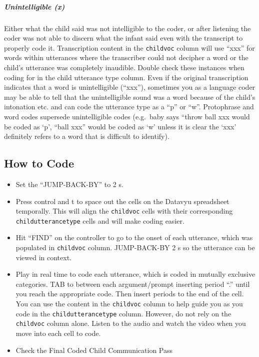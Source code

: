 \documentclass[
  12pt,
]{book}
\providecommand{\tightlist}{%
  \setlength{\itemsep}{0pt}\setlength{\parskip}{0pt}}
\begin{document}
\hypertarget{unintelligible_child}{%
\subparagraph*{Unintelligible (x)}\label{unintelligible_child}}

Either what the child said was not intelligible to the coder, or after listening the coder was not able to discern what the infant said even with the transcript to properly code it. Transcription content in the \texttt{childvoc} column will use ``xxx'' for words within utterances where the transcriber could not decipher a word or the child's utterance was completely inaudible. Double check these instances when coding for in the child utterance type column. Even if the original transcription indicates that a word is unintelligible (``xxx''), sometimes you as a language coder may be able to tell that the unintelligible sound was a word because of the child's intonation etc. and can code the utterance type as a ``p'' or ``w''.
Protophrase and word codes supersede unintelligible codes (e.g.~baby says ``throw ball xxx would be coded as `p', ``ball xxx'' would be coded as `w' unless it is clear the `xxx' definitely refers to a word that is difficult to identify).

\hypertarget{how-to-code}{%
\subsection*{How to Code}\label{how-to-code}}

\begin{itemize}
\tightlist
\item
  Set the ``JUMP-BACK-BY'' to 2 s.
\item
  Press control and t to space out the cells on the Datavyu spreadsheet temporally. This will align the \texttt{childvoc} cells with their corresponding \texttt{childutterancetype} cells and will make coding easier.
\item
  Hit ``FIND'' on the controller to go to the onset of each utterance, which was populated in \texttt{childvoc} column. JUMP-BACK-BY 2 s so the utterance can be viewed in context.
\item
  Play in real time to code each utterance, which is coded in mutually exclusive categories. TAB to between each argument/prompt inserting period ``.'' until you reach the appropriate code. Then insert periods to the end of the cell.
  You can use the content in the \texttt{childvoc} column to help guide you as you code in the \texttt{childutterancetype} column. However, do not rely on the \texttt{childvoc} column alone. Listen to the audio and watch the video when you move into each cell to code.
\item
  Check the Final Coded Child Communication Pass
\end{itemize}
\end{document}
